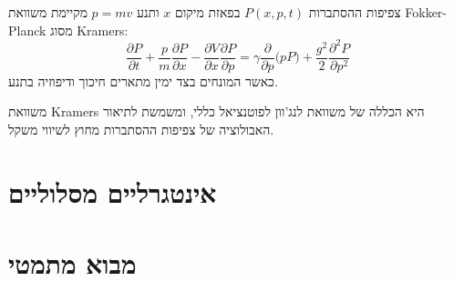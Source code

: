 \documentclass{tstextbook}
\begin{document}
\begin{proposition}
צפיפות ההסתברות \(P(x,p,t)\) בפאזת מיקום \(x\) ותנע \(p=m v\) מקיימת משוואת Fokker-Planck מסוג Kramers:
$$\frac{\partial P}{\partial t} + \frac{p}{m}\frac{\partial P}{\partial x} - \frac{\partial V}{\partial x}\frac{\partial P}{\partial p}= \gamma \frac{\partial}{\partial p}\bigl(p P\bigr) + \frac{g^{2}}{2}\frac{\partial^{2}P}{\partial p^{2}}
$$
כאשר המונחים בצד ימין מתארים חיכוך ודיפוזיה בתנע.

\end{proposition}
\begin{remark}
משוואת Kramers היא הכללה של משוואת לנג'וון לפוטנציאל כללי, ומשמשת לתיאור האבולוציה של צפיפות ההסתברות מחוץ לשיווי משקל.

\end{remark}
\section{אינטגרליים מסלוליים}

\section{מבוא מתמטי}
\end{document}
